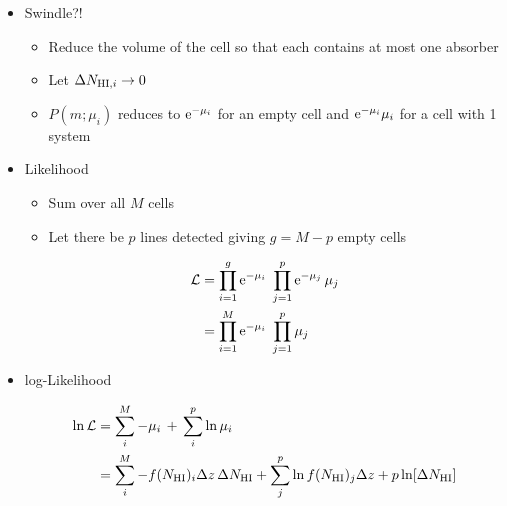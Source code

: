 \documentclass[12pt,letterpaper]{article}
\begin{document}
\begin{Aenumerate}
\begin{itemize}
\begin{itemize}
		\item Swindle?!
			\begin{itemize}
			\item Reduce the volume of the cell so that each contains
			at most one absorber
			\item Let $\Delta N_{{\rm HI},i} \to 0$
			\item $P(m;\mu_i)$ reduces to ${\rm e}^{-\mu_i}$ for an
			empty cell and ${\rm e}^{-\mu_i} \mu_i$ for a cell with 1 system
			\end{itemize}
		\item Likelihood
			\begin{itemize}
			\item Sum over all $M$ cells  
			\item Let there be $p$ lines detected giving $g=M-p$ empty cells
			\end{itemize}
		\begin{align}
		\mathcal{L} &= \prod\limits_{i=1}^g {\rm e}^{-\mu_i} \;
		\prod\limits_{j=1}^p {\rm e}^{-\mu_j} \, \mu_j \\
		  &= \prod\limits_{i=1}^M {\rm e}^{-\mu_i} \; \prod\limits_{j=1}^p \mu_j
		\end{align}
		\item log-Likelihood

		\begin{align}
		\ln \mathcal{L} &= \sum\limits_i^M -\mu_i \, + \, \sum\limits_i^p \ln \mu_i \\
		   &= \sum\limits_i^M -f(N_{\rm HI})_i \Delta z \, \Delta N_{\rm HI} +
		   \sum\limits_j^p \ln f(N_{\rm HI})_j \Delta z + p \ln [\Delta N_{\rm HI}]
		\end{align}


\end{itemize}
\end{itemize}
\end{Aenumerate}
\end{document}
